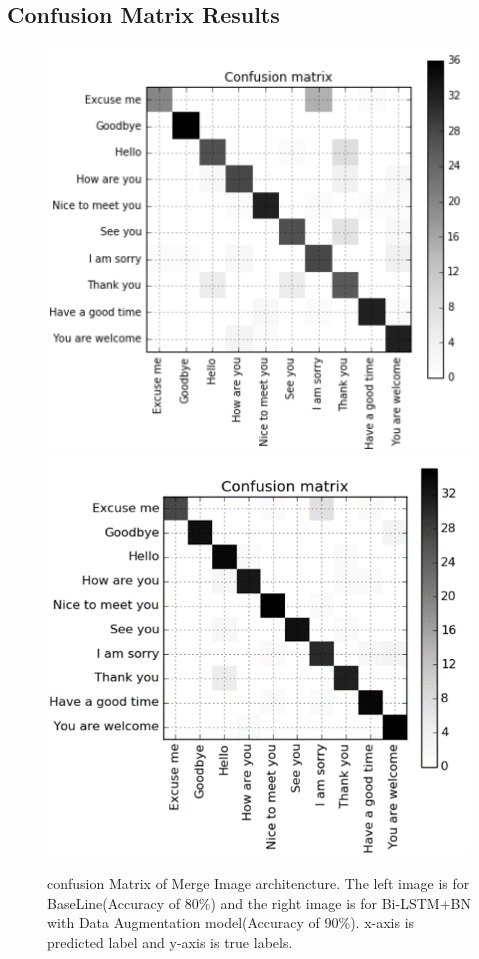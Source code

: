 \subsection{Confusion Matrix Results}
\begin{figure}[h]
	\centering
	\includegraphics[width=0.48\columnwidth]{fig/multi80MI.png}
	\includegraphics[width=0.5\columnwidth]{fig/multi90MI.png}
	\caption{confusion Matrix of Merge Image architencture. The left image is for BaseLine(Accuracy of 80\%) and the right image is for Bi-LSTM+BN with Data Augmentation model(Accuracy of 90\%).  x-axis is predicted label and y-axis is true labels.}
	\label{fig:multi80MI}
\end{figure}


